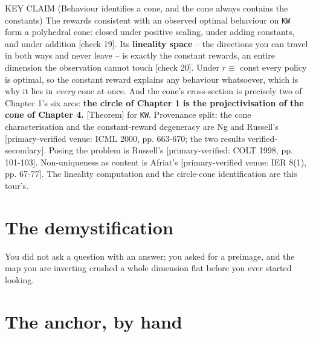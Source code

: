 \begin{whybox}{KEY CLAIM (Behaviour identifies a cone, and the cone always contains the constants)}
The rewards consistent with an observed optimal behaviour on \texttt{KW} form a polyhedral cone: closed under positive scaling, under adding constants, and under addition [check 19]. Its \textbf{lineality space} -- the directions you can travel in both ways and never leave -- is exactly the constant rewards, an entire dimension the observation cannot touch [check 20]. Under $r \equiv$ const every policy is optimal, so the constant reward explains any behaviour whatsoever, which is why it lies in \emph{every} cone at once. And the cone's cross-section is precisely two of Chapter 1's six arcs: \textbf{the circle of Chapter 1 is the projectivisation of the cone of Chapter 4.} [Theorem] for \texttt{KW}.
Provenance split: the cone characterisation and the constant-reward degeneracy are Ng and Russell's [primary-verified venue: ICML 2000, pp. 663-670; the two results verified-secondary]. Posing the problem is Russell's [primary-verified: COLT 1998, pp. 101-103]. Non-uniqueness as content is Afriat's [primary-verified venue: IER 8(1), pp. 67-77]. The lineality computation and the circle-cone identification are this tour's.
\end{whybox}

\section*{The demystification}

\begin{whyboxnt}
You did not ask a question with an answer; you asked for a preimage, and the map you are inverting crushed a whole dimension flat before you ever started looking.
\end{whyboxnt}

\section*{The anchor, by hand}

